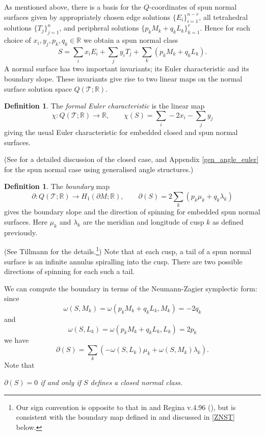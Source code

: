 \documentclass[12pt,reqno]{amsart}  %
\theoremstyle{definition}
\newtheorem{defn}[thm]{Definition}
\theoremstyle{remark}
\def\R{\mathbb{R}}
\newcommand{\T}{\mathcal{T}}
\def\bd{\partial}
\newcommand{\sect}{\textsection}
\begin{document}
As mentioned above, there is a basis for the $Q$-coordinates of spun 
normal surfaces given by appropriately chosen edge solutions 
$\{E_i \}_{i=1}^{n-r}$, all tetrahedral solutions $\{T_j \}_{j=1}^n$, and 
peripheral solutions $\{p_k M_k + q_k L_k\}_{k=1}^r$. Hence for each choice of 
$x_i,y_j,p_k,q_k \in \R$ we obtain a spun normal class
$$
S= \sum_i x_i E_i + \sum_j y_i T_j + \sum_k (p_k M_k +q_k L_k).
$$
A normal surface has two important invariants; its Euler 
characteristic and its boundary slope. These invariants give rise to 
two linear maps on the normal surface  solution space $Q(\T;\R)$.

\begin{defn}
The {\em formal Euler characteristic} is the linear map 
$$
\chi : Q(\T;\R) \to \R, \qquad \chi(S)= \sum_i -2x_i- \sum_j y_j 
$$
giving the usual Euler characteristic for embedded closed and spun normal 
surfaces.
\end{defn}

(See \cite{LT} for a detailed discussion of the closed case, and 
Appendix \ref{gen_angle_euler} for the spun normal case using generalised 
angle structures.)

\begin{defn} 
The {\em boundary} map 
$$
\bd : Q(\T;\R) \to H_1(\bd M;\R), \qquad \bd(S)= 
2 \sum_k (p_k \mu_k +q_k \lambda_k)
$$
gives the boundary slope and the direction of spinning for embedded spun 
normal surfaces. Here $\mu_k$ and $\lambda_k$ are the meridian and longitude of cusp $k$ as defined previously. 
\end{defn}

(See Tillmann \cite{Ti} for the details.\footnote{Our sign convention is 
opposite to that in \cite{Ti} and Regina v.4.96 (\cite{regina}),
but is consistent with the boundary map defined in \cite{N} and discussed 
in \sect \ref{ZNST} below.}) Note that at each cusp, a tail of a spun 
normal surface is an infinite annulus spiralling into the cusp. There are 
two possible directions of spinning for each such a tail.

We can compute the boundary  in terms of the Neumann-Zagier symplectic 
form: since
$$
\omega(S,M_k) = \omega(p_k M_k +q_k L_k,M_k)=-2q_k
$$
and
$$
\omega(S,L_k) = \omega(p_k M_k +q_k L_k,L_k)=2p_k
$$
we have
$$
\bd(S)= \sum_k \left(  -\omega(S,L_k) \mu_k + \omega(S,M_k) \lambda_k \right).
$$
Note that 
\begin{center}
\emph{$\bd(S)=0$ if and only if $S$ defines a closed normal class.}
\end{center}
\end{document}
